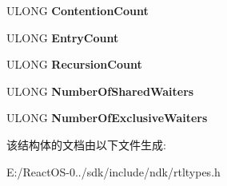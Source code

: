 \begin{DoxyCompactItemize}
U\+L\+O\+NG {\bfseries Contention\+Count}
\item 
\mbox{\label{struct___r_t_l___p_r_o_c_e_s_s___l_o_c_k___i_n_f_o_r_m_a_t_i_o_n_af6534ae973198587ecf4ab3ed259f0a7}} 
U\+L\+O\+NG {\bfseries Entry\+Count}
\item 
\mbox{\label{struct___r_t_l___p_r_o_c_e_s_s___l_o_c_k___i_n_f_o_r_m_a_t_i_o_n_a84ef434555b7d680bea8ac3edc7b2d2d}} 
U\+L\+O\+NG {\bfseries Recursion\+Count}
\item 
\mbox{\label{struct___r_t_l___p_r_o_c_e_s_s___l_o_c_k___i_n_f_o_r_m_a_t_i_o_n_a26670f38f7c41f4cc476891b5bed016b}} 
U\+L\+O\+NG {\bfseries Number\+Of\+Shared\+Waiters}
\item 
\mbox{\label{struct___r_t_l___p_r_o_c_e_s_s___l_o_c_k___i_n_f_o_r_m_a_t_i_o_n_a7e197388362023122fdb71a85a447a8e}} 
U\+L\+O\+NG {\bfseries Number\+Of\+Exclusive\+Waiters}
\end{DoxyCompactItemize}


该结构体的文档由以下文件生成\+:\begin{DoxyCompactItemize}
\item 
E\+:/\+React\+O\+S-\/0../sdk/include/ndk/rtltypes.\+h\end{DoxyCompactItemize}
